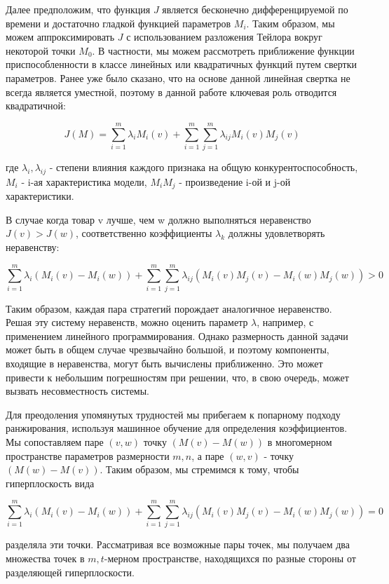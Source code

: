 \documentclass[14pt, a4paper]{extarticle}
\begin{document}
  Далее предположим, что функция \( J \) является бесконечно дифференцируемой по времени и достаточно гладкой функцией параметров \( M_i \). Таким образом, мы можем аппроксимировать \( J \) с использованием разложения Тейлора вокруг некоторой точки \( M_0 \). В частности, мы можем рассмотреть приближение функции приспособленности в классе линейных или квадратичных функций путем свертки параметров. Ранее уже было сказано, что на основе данной линейная свертка не всегда является уместной, поэтому в данной работе ключевая роль отводится квадратичной:
  
  \[
  J(M) = \sum_{i=1}^m \lambda_i M_i(v) + \sum_{i=1}^m \sum_{j=1}^m \lambda_{ij} M_i(v) M_j(v)
  \]
  
  где \( \lambda_i, \lambda_{ij} \) - степени влияния каждого признака на общую конкурентоспособность, \( M_i \) - i-ая характеристика модели, \( M_iM_j \) - произведение i-ой и j-ой характеристики.
  
  В случае когда товар v лучше, чем w должно выполняться неравенство \( J(v) > J(w) \), соответственно коэффициенты \( \lambda_k \) должны удовлетворять неравенству:
  
  \[
  \sum_{i=1}^m \lambda_i(M_i(v) - M_i(w)) + \sum_{i=1}^m \sum_{j=1}^m \lambda_{ij} (M_i(v) M_j(v) - M_i(w) M_j(w)) > 0
  \]
  
  Таким образом, каждая пара стратегий порождает аналогичное неравенство. Решая эту систему неравенств, можно оценить параметр \( \lambda \), например, с применением линейного программирования. Однако размерность данной задачи может быть в общем случае чрезвычайно большой, и поэтому компоненты, входящие в неравенства, могут быть вычислены приближенно. Это может привести к небольшим погрешностям при решении, что, в свою очередь, может вызвать несовместность системы.

Для преодоления упомянутых трудностей мы прибегаем к попарному подходу ранжирования, используя машинное обучение для определения коэффициентов. Мы сопоставляем паре \( (v, w) \) точку \( (M(v) - M(w)) \) в многомерном пространстве параметров размерности \( m, n \), а паре \( (w, v) \) - точку \( (M(w) - M(v)) \). Таким образом, мы стремимся к тому, чтобы гиперплоскость вида

\[
\sum_{i=1}^m \lambda_i(M_i(v) - M_i(w)) + \sum_{i=1}^m \sum_{j=1}^m \lambda_{ij}(M_i(v)M_j(v) - M_i(w)M_j(w)) = 0
\]

разделяла эти точки. Рассматривая все возможные пары точек, мы получаем два множества точек в \( m, t \)-мерном пространстве, находящихся по разные стороны от разделяющей гиперплоскости.
\end{document}
